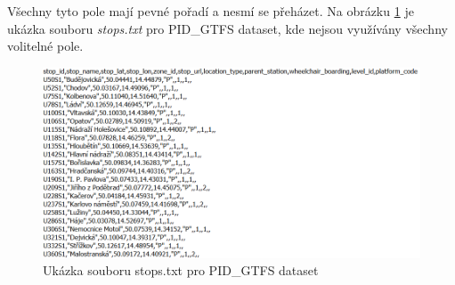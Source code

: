 Všechny tyto pole mají pevné pořadí a nesmí se přeházet. Na obrázku \ref{fig:stops} je ukázka  souboru \textit{stops.txt}
pro PID\_GTFS dataset, kde nejsou využívány všechny volitelné pole.

\begin{figure}[H] \centering
    \includegraphics[width=400pt]{./pictures/stops.PNG}
    \caption[Ukázka  souboru stops.txt pro PID\_GTFS dataset]{Ukázka  souboru stops.txt pro PID\_GTFS dataset}
	\label{fig:stops}              
\end{figure} 